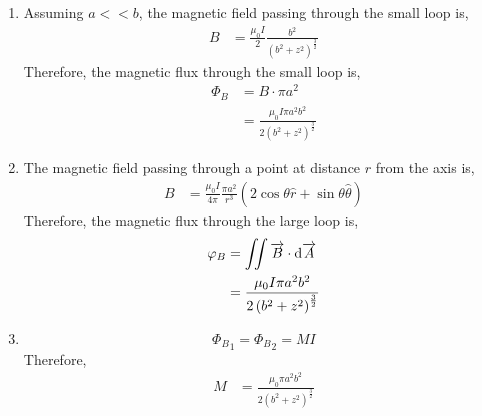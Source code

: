 \documentclass[fleqn, a4paper, 11pt, oneside]{amsart}
\theoremstyle{definition}
\theoremstyle{theorem}
\begin{document}
\begin{solution}
	\begin{enumerate}[leftmargin = *]
		\item
			Assuming $a << b$, the magnetic field passing through the small loop is,
			\begin{align*}
				B &= \frac{\mu_0 I}{2} \frac{b^2}{\left( b^2 + z^2 \right)^{\frac{3}{2}}}
			\end{align*}
			Therefore, the magnetic flux through the small loop is,
			\begin{align*}
				\Phi_B &= B \cdot \pi a^2\\
				&= \frac{\mu_0 I \pi a^2 b^2}{2 \left( b^2 + z^2 \right)^{\frac{3}{2}}}
			\end{align*}
		\item
			The magnetic field passing through a point at distance $r$ from the axis is,
			\begin{align*}
				B &= \frac{\mu_0 I}{4 \pi} \frac{\pi a^2}{r^3} \left( 2 \cos \theta \hat{r} + \sin \theta \hat{\theta} \right)
			\end{align*}
			Therefore, the magnetic flux through the large loop is,
			\begin{align*}
				\varphi_B &= \iint \overrightarrow{B} \cdot \dif \overrightarrow{A}\\
				&= \frac{\mu_0 I \pi a^2 b^2}{2 \left( b^2 + z^2 \right)^{\frac{3}{2}}}
			\end{align*}
		\item
			\begin{equation*}
				{\Phi_B}_1 = {\Phi_B}_2 = M I
			\end{equation*}
			Therefore,
			\begin{align*}
				M &= \frac{\mu_0 \pi a^2 b^2}{2 \left( b^2 + z^2 \right)^{\frac{3}{2}}}
			\end{align*}
	\end{enumerate}
\end{solution}
\end{document}
